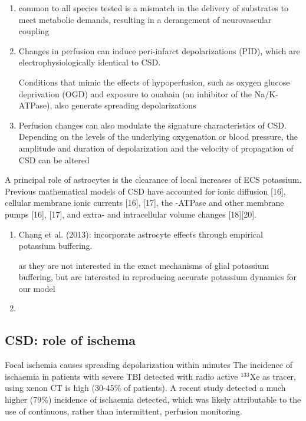 \begin{enumerate}
  \item  common to all species tested is a mismatch in the delivery of
  substrates to meet metabolic demands, resulting in a derangement of
  neurovascular coupling 
  
  \item Changes in perfusion can induce peri-infarct depolarizations (PID),
  which are electrophysiologically identical to CSD.
  
Conditions that mimic the effects of hypoperfusion, such as oxygen glucose
deprivation (OGD) and exposure to ouabain (an inhibitor of the Na/K-ATPase),
also generate spreading depolarizations 

  \item Perfusion changes can also modulate the signature characteristics of
  CSD. Depending on the levels of the underlying oxygenation or blood pressure,
  the amplitude and duration of depolarization and the velocity of propagation
  of CSD can be altered  

\end{enumerate}

A principal role of astrocytes is the clearance of local increases of ECS
potassium. Previous mathematical models of CSD have accounted for ionic
diffusion [16], cellular membrane ionic currents [16], [17], the -ATPase and
other membrane pumps [16], [17], and extra- and intracellular volume changes
[18][20].
\begin{enumerate}
  \item Chang et al. (2013): incorporate astrocyte effects through empirical
  potassium buffering.
  
as they are not interested in the exact mechanisms of glial potassium buffering,
but are interested in reproducing accurate potassium dynamics for our model
  
  \item 
\end{enumerate}

\subsection{CSD: role of ischema}
\label{sec:CSD-role-of-ischema}

Focal ischemia causes spreading depolarization within minutes The incidence of
ischaemia in patients with severe TBI detected with radio active
$^{133}$Xe as tracer, using xenon CT is high (30-45\% of patients).
A recent study detected a much higher (79\%) incidence of ischaemia detected,
which was likely attributable to the use of continuous, rather than
intermittent, perfusion monitoring.


